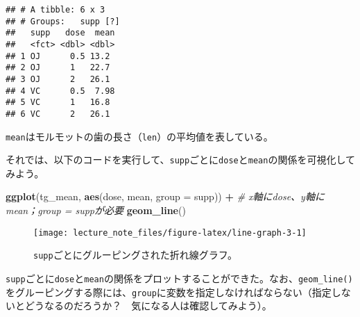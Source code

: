\documentclass[]{book}
\newenvironment{Shaded}{\begin{snugshade}}{\end{snugshade}}
\newcommand{\KeywordTok}[1]{\textcolor[rgb]{0.13,0.29,0.53}{\textbf{#1}}}
\newcommand{\DataTypeTok}[1]{\textcolor[rgb]{0.13,0.29,0.53}{#1}}
\newcommand{\StringTok}[1]{\textcolor[rgb]{0.31,0.60,0.02}{#1}}
\newcommand{\CommentTok}[1]{\textcolor[rgb]{0.56,0.35,0.01}{\textit{#1}}}
\newcommand{\OperatorTok}[1]{\textcolor[rgb]{0.81,0.36,0.00}{\textbf{#1}}}
\newcommand{\NormalTok}[1]{#1}
\begin{document}
\begin{Shaded}
\end{Shaded}

\begin{verbatim}
## # A tibble: 6 x 3
## # Groups:   supp [?]
##   supp   dose  mean
##   <fct> <dbl> <dbl>
## 1 OJ      0.5 13.2 
## 2 OJ      1   22.7 
## 3 OJ      2   26.1 
## 4 VC      0.5  7.98
## 5 VC      1   16.8 
## 6 VC      2   26.1
\end{verbatim}

\texttt{mean}はモルモットの歯の長さ（\texttt{len}）の平均値を表している。

それでは、以下のコードを実行して、\texttt{supp}ごとに\texttt{dose}と\texttt{mean}の関係を可視化してみよう。



\begin{Shaded}
\begin{Highlighting}[]
\KeywordTok{ggplot}\NormalTok{(tg_mean, }\KeywordTok{aes}\NormalTok{(dose, mean, }\DataTypeTok{group =}\NormalTok{ supp)) }\OperatorTok{+}\StringTok{ }\CommentTok{# x軸にdose、y軸にmean；group = suppが必要}
\StringTok{  }\KeywordTok{geom_line}\NormalTok{()}
\end{Highlighting}
\end{Shaded}

\begin{figure}

{\centering \texttt{[image: lecture\_note\_files/figure-latex/line-graph-3-1]} 

}

\caption{\texttt{supp}ごとにグルーピングされた折れ線グラフ。}\label{fig:line-graph-3}
\end{figure}

\texttt{supp}ごとに\texttt{dose}と\texttt{mean}の関係をプロットすることができた。なお、\texttt{geom\_line()}をグルーピングする際には、\texttt{group}に変数を指定しなければならない（指定しないとどうなるのだろうか？　気になる人は確認してみよう）。
\end{document}
